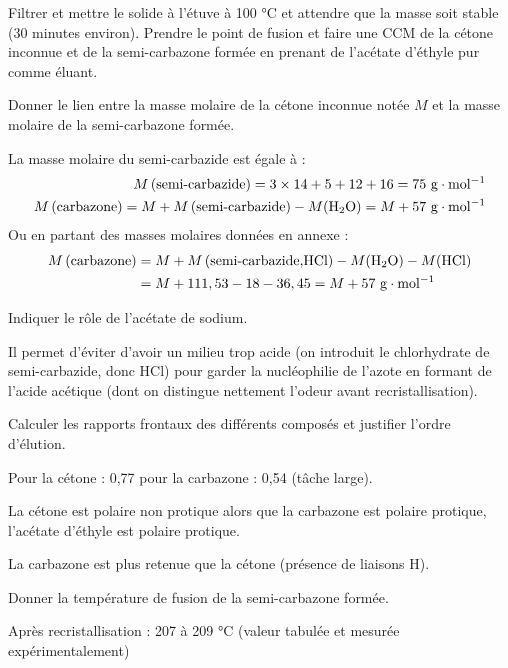 \documentclass[twoside,a4paper,11pt,answers]{exam}
\begin{document}
Filtrer et mettre le solide à l'étuve à 100 °C et attendre que la masse soit stable (30 minutes environ). Prendre le point de fusion et faire une CCM de la cétone inconnue et de la semi-carbazone formée en prenant de l'acétate d'éthyle pur comme éluant.

\begin{questions}
\begin{framed}
\question Donner le lien entre la masse molaire de la cétone inconnue notée $M$ et la masse molaire de la semi-carbazone formée.
\begin{solution}[3cm]
La masse molaire du semi-carbazide est égale à : \begin{align}
M\left(\text{semi-carbazide} \right)=3\times 14+5+12+16=75~\mathrm{g\cdot mol^{-1}}\\
M\left(\text{carbazone} \right)=M+M\left(\text{semi-carbazide} \right)-M(\mathrm{H_2O})=M+57 ~\mathrm{g\cdot mol^{-1}}
\end{align}
Ou en partant des masses molaires données en annexe :
\begin{align}
M\left(\text{carbazone} \right)={}&M+M\left(\text{semi-carbazide,HCl} \right)-M(\mathrm{H_2O})-M(\mathrm{HCl})\\
={}&M+111,53-18-36,45=M+57~\mathrm{g\cdot mol^{-1}}
\end{align}
\end{solution}
\end{framed}
\begin{framed}
\question Indiquer le rôle de l'acétate de sodium.
\begin{solution}[3cm]
Il permet d'éviter d'avoir un milieu trop acide (on introduit le chlorhydrate de semi-carbazide, donc HCl) pour garder la nucléophilie de l'azote en formant de l'acide acétique (dont on distingue nettement l'odeur avant recristallisation).
\end{solution}
\end{framed}

\begin{framed}
\question Calculer les rapports frontaux des différents composés et justifier l’ordre d’élution.
\begin{solution}[5cm]
Pour la cétone : 0,77 pour la carbazone : 0,54 (tâche large).

La cétone est polaire non protique alors que la carbazone est polaire protique, l'acétate d'éthyle est polaire protique. 

La carbazone est plus retenue que la cétone (présence de liaisons H).
\end{solution}
\end{framed}
\begin{framed}
\question Donner la température de fusion de la semi-carbazone formée.
\begin{solution}[5cm]
Après recristallisation : 207 à 209 °C (valeur tabulée et mesurée expérimentalement)
\end{solution}
\end{framed}


\end{questions}
\end{document}
